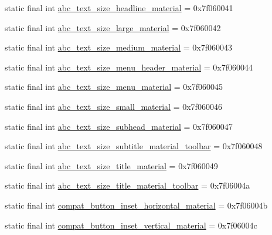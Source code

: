\begin{DoxyCompactItemize}
static final int \mbox{\hyperlink{classandroid_1_1support_1_1design_1_1_r_1_1dimen_a2081000949435fecb9964aa41ab05907}{abc\+\_\+text\+\_\+size\+\_\+headline\+\_\+material}} = 0x7f060041
\item 
static final int \mbox{\hyperlink{classandroid_1_1support_1_1design_1_1_r_1_1dimen_af1d4e99b6a3ce4f2fb3ba72c6b953412}{abc\+\_\+text\+\_\+size\+\_\+large\+\_\+material}} = 0x7f060042
\item 
static final int \mbox{\hyperlink{classandroid_1_1support_1_1design_1_1_r_1_1dimen_a6479afaabebd9416c3403c54b0f5bd59}{abc\+\_\+text\+\_\+size\+\_\+medium\+\_\+material}} = 0x7f060043
\item 
static final int \mbox{\hyperlink{classandroid_1_1support_1_1design_1_1_r_1_1dimen_ad9d7d21903709ee861bf41444d421972}{abc\+\_\+text\+\_\+size\+\_\+menu\+\_\+header\+\_\+material}} = 0x7f060044
\item 
static final int \mbox{\hyperlink{classandroid_1_1support_1_1design_1_1_r_1_1dimen_a03965514ad78473ff07b5eba8191081b}{abc\+\_\+text\+\_\+size\+\_\+menu\+\_\+material}} = 0x7f060045
\item 
static final int \mbox{\hyperlink{classandroid_1_1support_1_1design_1_1_r_1_1dimen_a8a4fb3e596b4b3a400c7623b71bf5ff3}{abc\+\_\+text\+\_\+size\+\_\+small\+\_\+material}} = 0x7f060046
\item 
static final int \mbox{\hyperlink{classandroid_1_1support_1_1design_1_1_r_1_1dimen_aebb837455075fb116b55f1e630d32dd5}{abc\+\_\+text\+\_\+size\+\_\+subhead\+\_\+material}} = 0x7f060047
\item 
static final int \mbox{\hyperlink{classandroid_1_1support_1_1design_1_1_r_1_1dimen_a2c3b879fdd2573d992fedf97f0e2295b}{abc\+\_\+text\+\_\+size\+\_\+subtitle\+\_\+material\+\_\+toolbar}} = 0x7f060048
\item 
static final int \mbox{\hyperlink{classandroid_1_1support_1_1design_1_1_r_1_1dimen_abbfc491717374b99ef03c57688c58ec0}{abc\+\_\+text\+\_\+size\+\_\+title\+\_\+material}} = 0x7f060049
\item 
static final int \mbox{\hyperlink{classandroid_1_1support_1_1design_1_1_r_1_1dimen_a7f3928a1b96bdd9950713ed0212b419a}{abc\+\_\+text\+\_\+size\+\_\+title\+\_\+material\+\_\+toolbar}} = 0x7f06004a
\item 
static final int \mbox{\hyperlink{classandroid_1_1support_1_1design_1_1_r_1_1dimen_a163188ceb5909a90a9fb00792cf24eb5}{compat\+\_\+button\+\_\+inset\+\_\+horizontal\+\_\+material}} = 0x7f06004b
\item 
static final int \mbox{\hyperlink{classandroid_1_1support_1_1design_1_1_r_1_1dimen_a469cb854a366414b9c4e40014d8d26ce}{compat\+\_\+button\+\_\+inset\+\_\+vertical\+\_\+material}} = 0x7f06004c

\end{DoxyCompactItemize}

